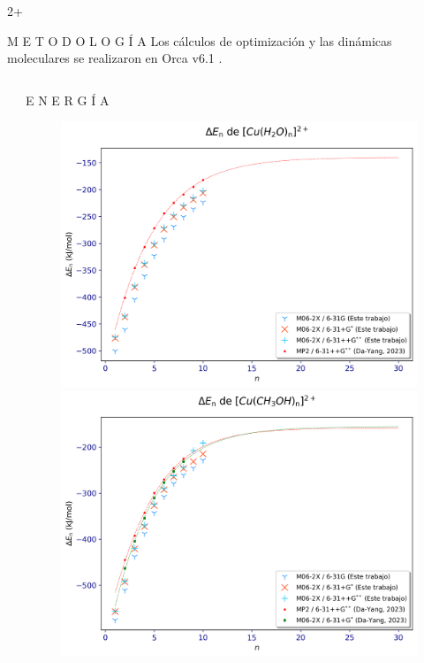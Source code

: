 \documentclass[final]{beamer}
\newlength{\sepwidth}
\newlength{\colwidth}
\newcommand{\separatorcolumn}{\begin{column}{\sepwidth}\end{column}}
\begin{document}
\begin{frame}[t]
\begin{columns}[t]
\begin{column}{2\colwidth+\sepwidth}
\begin{exampleblock}{M E T O D O L O G Í A}{}
				Los cálculos de optimización y las dinámicas moleculares se realizaron en Orca v6.1 \cite{orca}.

			\end{exampleblock}		

		\end{column}

	\end{columns}

	\begin{columns}[t]

		\separatorcolumn
		
		\begin{column}{\colwidth}
			
			\begin{block}{E N E R G Í A}{}

				\begin{figure}[H]
					\centering
					\begin{minipage}[b]{0.48\textwidth}
						\centering
						\includegraphics[width=\textwidth]{logos/bases_agua.png}
					\end{minipage}%
					\hfill
					\begin{minipage}[b]{0.48\textwidth}
						\centering
						\includegraphics[width=\textwidth]{logos/bases_metanol.png}

\end{minipage}
\end{figure}
\end{block}
\end{column}
\end{columns}
\end{frame}
\end{document}

